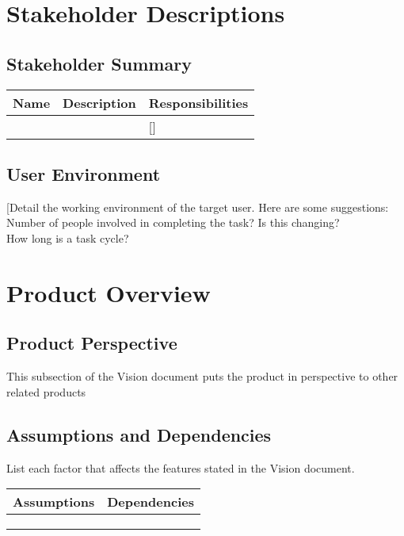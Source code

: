 \documentclass[11pt, a4paper]{supplemental-document}
\begin{document}
\section{Stakeholder Descriptions}
\subsection{Stakeholder Summary}
\begin{table}[H]
\centering
\begin{tabular}{||p{4cm}||p{5cm}||p{5cm}||}
\hline
Name & {Description }&{Responsibilities}\\
\hline
\hline
[stakeholder type.] & {[stakeholder description] &   [] }\\
\hline
\hline
\end{tabular}
\label{tab:problem statement}
 \end{table}
\subsection{User Environment}
[Detail the working environment of the target user. Here are some suggestions:\\
Number of people involved in completing the task? Is this changing?\\
How long is a task cycle? \\

\section{Product Overview}
\subsection{Product Perspective}
This subsection of the Vision document puts the product in perspective to other related products\\
\subsection{Assumptions and Dependencies}
List each factor that affects the features stated in the Vision document.\\

\begin{table}[H]
\centering
\begin{tabular}{||p{4cm}||p{7cm}||}
\hline

Assumptions & {Dependencies }\\
\hline
[state any assumptions]	 & { }\\
\hline
\hline
[ ]	 & { }\\
\hline
\hline
[ ]	 & { }\\
\hline
\end{tabular}
\label{tab:problem statement}
 \end{table}
\end{document}
